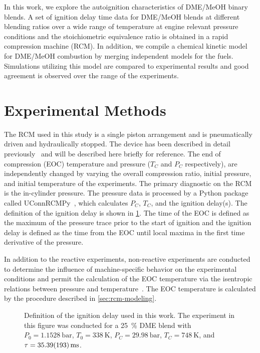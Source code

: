 \documentclass[12pt]{../ussci}
\begin{document}
In this work, we explore the autoignition characteristics of DME/MeOH binary
blends. A set of ignition delay time data for DME/MeOH blends at different
blending ratios over a wide range of temperature at engine relevant pressure
conditions and the stoichiometric equivalence ratio is obtained in a rapid
compression machine (RCM). In addition, we compile a chemical kinetic model for
DME/MeOH combustion by merging independent models for the fuels. Simulations
utilizing this model are compared to experimental results and good agreement is
observed over the range of the experiments.

\section{Experimental Methods}\label{sec:experimental-methods}

The RCM used in this study is a single piston arrangement and is pneumatically
driven and hydraulically stopped. The device has been described in detail
previously~\autocite{Mittal2007a} and will be described here briefly for
reference. The end of compression (EOC) temperature and pressure (\(T_C\) and
\(P_C\) respectively), are independently changed by varying the overall
compression ratio, initial pressure, and initial temperature of the experiments.
The primary diagnostic on the RCM is the in-cylinder pressure. The pressure data
is processed by a Python package called UConnRCMPy~\autocite{uconnrcmpy}, which
calculates \(P_C\), \(T_C\), and the ignition delay(s). The definition of the
ignition delay is shown in \cref{fig:ign-delay-def}. The time of the EOC is
defined as the maximum of the pressure trace prior to the start of ignition and
the ignition delay is defined as the time from the EOC until local maxima in
the first time derivative of the pressure.

In addition to the reactive experiments, non-reactive experiments are conducted
to determine the influence of machine-specific behavior on the experimental
conditions and permit the calculation of the EOC temperature via the isentropic
relations between pressure and temperature~\autocite{Lee1998}. The EOC
temperature is calculated by the procedure described in
\cref{sec:rcm-modeling}.

\begin{figure}[htb]
    \centering
    \resizebox{0.6\textwidth}{!}{}
    \caption{Definition of the ignition delay used in this work. The
    experiment in this figure was conducted for a \SI{25}{\percent} DME blend
    with \(P_0=\SI{1.1528}{\bar}\), \(T_0=\SI{338}{\K}\),
    \(P_C=\SI{29.98}{\bar}\), \(T_C=\SI{748}{\K}\), and
    \(\tau=\SI{35.39\pm1.93}{\ms}\).}
    \label{fig:ign-delay-def}
\end{figure}
\end{document}
